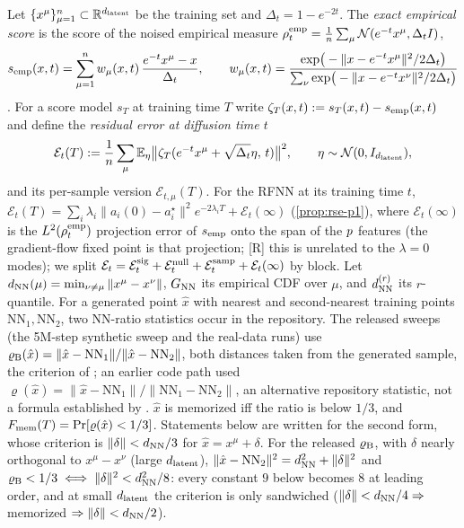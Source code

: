 \begin{definition}\label{def:bridge-objects}
Let $\{x^\mu\}_{\mu=1}^{n}\subset\mathbb{R}^{d_{\mathrm{latent}}}$ be the training set and $\Delta_t=1-e^{-2t}$. The \emph{exact empirical score} is the score of the noised empirical measure $\rho^{\rm emp}_t=\frac1{n}\sum_\mu\mathcal N(e^{-t}x^\mu,\Delta_t I)$,
\begin{equation}\label{eq:semp}
 s_{\rm emp}(x,t)=\sum_{\mu=1}^{n} w_\mu(x,t)\,\frac{e^{-t}x^\mu-x}{\Delta_t},\qquad w_\mu(x,t)=\frac{\exp\!\big(-\|x-e^{-t}x^\mu\|^2/2\Delta_t\big)}{\sum_\nu \exp\!\big(-\|x-e^{-t}x^\nu\|^2/2\Delta_t\big)}
\end{equation}
\citep{scarvelis2023closedform,gu2023memorization}. For a score model $s_T$ at training time $T$ write $\zeta_T(x,t):=s_T(x,t)-s_{\rm emp}(x,t)$ and define the \emph{residual error at diffusion time $t$}
\begin{equation}\label{eq:ET}
 \mathcal E_t(T):=\frac1{n}\sum_{\mu}\mathbb{E}_{\eta}\big\|\zeta_T(e^{-t}x^\mu+\sqrt{\Delta_t}\eta,\,t)\big\|^2,\qquad \eta\sim\mathcal N(0,I_{d_{\mathrm{latent}}}),
\end{equation}
and its per-sample version $\mathcal E_{t,\mu}(T)$. For the RFNN at its training time $t$, $\mathcal E_t(T)=\sum_i\lambda_i\|a_i(0)-a_i^\star\|^2e^{-2\lambda_iT}+\mathcal E_t(\infty)$ (\cref{prop:rse-p1}), where $\mathcal E_t(\infty)$ is the $L^2(\rho^{\rm emp}_t)$ projection error of $s_{\rm emp}$ onto the span of the $p$ features (the gradient-flow fixed point is that projection; [R] this is unrelated to the $\lambda=0$ modes); we split $\mathcal E_t=\mathcal E^{\rm sig}_t+\mathcal E^{\rm null}_t+\mathcal E^{\rm samp}_t+\mathcal E_t(\infty)$ by block. Let $d_{\rm NN}(\mu)=\min_{\nu\neq\mu}\|x^\mu-x^\nu\|$, $G_{\rm NN}$ its empirical CDF over $\mu$, and $d_{\rm NN}^{(r)}$ its $r$-quantile. For a generated point $\hat x$ with nearest and second-nearest training points $\mathrm{NN}_1,\mathrm{NN}_2$, two NN-ratio statistics occur in the repository. The released sweeps (the 5M-step synthetic sweep and the real-data runs) use $\varrho_{\rm B}(\hat x)=\|\hat x-\mathrm{NN}_1\|/\|\hat x-\mathrm{NN}_2\|$, both distances taken from the generated sample, the criterion of \citet{bonnaire2025}; an earlier code path used $\varrho(\hat x)=\|\hat x-\mathrm{NN}_1\|/\|\mathrm{NN}_1-\mathrm{NN}_2\|$, an alternative repository statistic, not a formula established by \citet{somepalli2023diffusion}. $\hat x$ is memorized iff the ratio is below $1/3$, and $F_{\rm mem}(T)=\Pr[\varrho(\hat x)<1/3]$. Statements below are written for the second form, whose criterion is $\|\delta\|<d_{\rm NN}/3$ for $\hat x=x^\mu+\delta$. For the released $\varrho_{\rm B}$, with $\delta$ nearly orthogonal to $x^\mu-x^\nu$ (large $d_{\mathrm{latent}}$), $\|\hat x-\mathrm{NN}_2\|^2=d_{\rm NN}^2+\|\delta\|^2$ and $\varrho_{\rm B}<1/3\iff\|\delta\|^2<d_{\rm NN}^2/8$: every constant $9$ below becomes $8$ at leading order, and at small $d_{\mathrm{latent}}$ the criterion is only sandwiched ($\|\delta\|<d_{\rm NN}/4\Rightarrow$ memorized $\Rightarrow\|\delta\|<d_{\rm NN}/2$).
\end{definition}

